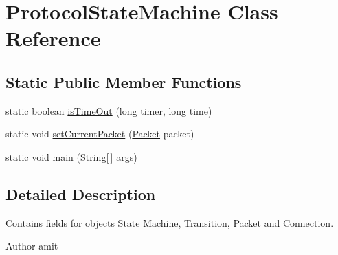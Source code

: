 \hypertarget{class_protocol_state_machine}{\section{Protocol\-State\-Machine Class Reference}
\label{class_protocol_state_machine}
}
\subsection*{Static Public Member Functions}
\begin{DoxyCompactItemize}
\item 
static boolean \hyperlink{class_protocol_state_machine_ab16976efe8017a6cf4b7bac29fa6a5bd}{is\-Time\-Out} (long timer, long time)
\item 
static void \hyperlink{class_protocol_state_machine_ab210fe7d2c2a4ce4c4120cdb70b8b6fd}{set\-Current\-Packet} (\hyperlink{class_packet}{Packet} packet)
\item 
static void \hyperlink{class_protocol_state_machine_af033fb0f497cbf5c1c3e006fb09cf966}{main} (String\mbox{[}$\,$\mbox{]} args)
\end{DoxyCompactItemize}


\subsection{Detailed Description}
Contains fields for objects \hyperlink{class_state}{State} Machine, \hyperlink{class_transition}{Transition}, \hyperlink{class_packet}{Packet} and Connection. \begin{DoxyAuthor}{Author}
amit 
\end{DoxyAuthor}


